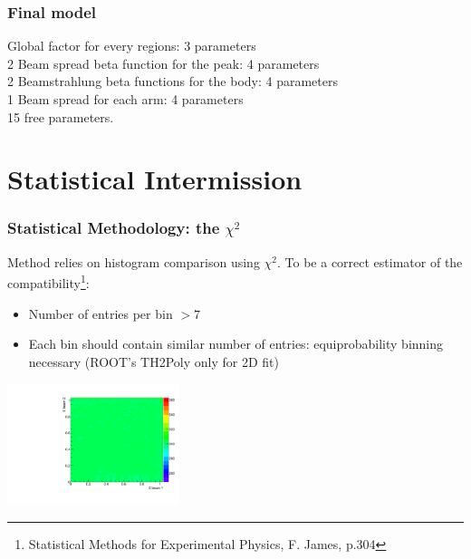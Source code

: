 \documentclass{beamer}
\begin{document}
\begin{frame}
\frametitle{Final model}
Global factor for every regions: 3 parameters\\
2 Beam spread beta function for the peak: 4 parameters\\
2 Beamstrahlung beta functions for the body: 4 parameters\\
1 Beam spread for each arm: 4 parameters\\
\alert{15 free parameters}.
\end{frame}

\section{Statistical Intermission}
\begin{frame}
\frametitle{Statistical Methodology: the $\chi^2$}
Method relies on histogram comparison using $\chi^2$. To be a correct estimator
of the compatibility\footnote{Statistical Methods for 
Experimental Physics, F. James, p.304}:
\begin{itemize}
  \item Number of entries per bin $>7$
  \item Each bin should contain similar number of entries: equiprobability
  binning necessary (ROOT's TH2Poly only for 2D fit)
\end{itemize}
\begin{center}
\includegraphics[width=5cm]{Th2PolyRef.pdf}
\end{center}
\end{frame}
\end{document}
